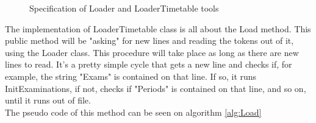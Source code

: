 \begin{figure}[t!]
\centering
{}

\caption{Specification of Loader and LoaderTimetable tools} \label{fig:Loaders}
\end{figure}

The implementation of LoaderTimetable class is all about the Load method. This public method will be "asking" for new lines and reading the tokens out of it, using the Loader class. This procedure will take place as long as there are new lines to read. It's a pretty simple cycle that gets a new line and checks if, for example, the string "Exams" is contained on that line. If so, it runs InitExaminations, if not, checks if "Periods" is contained on that line, and so on, until it runs out of file.\\

The pseudo code of this method can be seen on algorithm \ref{alg:Load}

